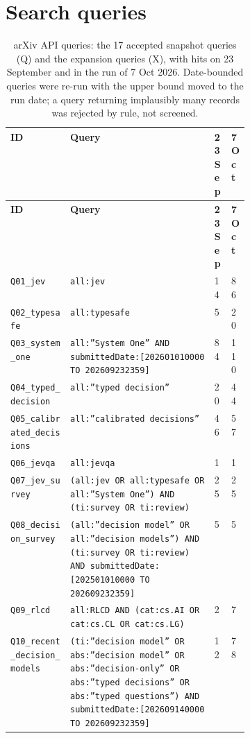 \section{Search queries}\label{sec:appendix-a-search-queries}

{\footnotesize
\begin{xltabular}{\linewidth}{>{\raggedright\arraybackslash}p{0.25\linewidth}Xp{0.075\linewidth}p{0.075\linewidth}}
\caption{arXiv API queries: the 17 accepted snapshot queries (Q) and the expansion queries (X), with hits on 23 September and in the run of 7 Oct 2026. Date-bounded queries were re-run with the upper bound moved to the run date; a query returning implausibly many records was rejected by rule, not screened.}\label{tab:queries}\\
\toprule
\textbf{ID} & \textbf{Query} & \textbf{23 Sep} & \textbf{7 Oct} \\
\midrule
\endfirsthead
\toprule
\textbf{ID} & \textbf{Query} & \textbf{23 Sep} & \textbf{7 Oct} \\
\midrule
\endhead
\texttt{\footnotesize Q01\_jev} & \texttt{\footnotesize all:jev} & 14 & 86 \\
\texttt{\footnotesize Q02\_typesafe} & \texttt{\footnotesize all:typesafe} & 5 & 20 \\
\texttt{\footnotesize Q03\_system\_one} & \texttt{\footnotesize all:”System One” AND submittedDate:[202601010000 TO 202609232359]} & 84 & 110 \\
\texttt{\footnotesize Q04\_typed\_decision} & \texttt{\footnotesize all:”typed decision”} & 20 & 44 \\
\texttt{\footnotesize Q05\_calibrated\_decisions} & \texttt{\footnotesize all:”calibrated decisions”} & 46 & 57 \\
\texttt{\footnotesize Q06\_jevqa} & \texttt{\footnotesize all:jevqa} & 1 & 1 \\
\texttt{\footnotesize Q07\_jev\_survey} & \texttt{\footnotesize (all:jev OR all:typesafe OR all:”System One”) AND (ti:survey OR ti:review)} & 25 & 25 \\
\texttt{\footnotesize Q08\_decision\_survey} & \texttt{\footnotesize (all:”decision model” OR all:”decision models”) AND (ti:survey OR ti:review) AND submittedDate:[202501010000 TO 202609232359]} & 5 & 5 \\
\texttt{\footnotesize Q09\_rlcd} & \texttt{\footnotesize all:RLCD AND (cat:cs.AI OR cat:cs.CL OR cat:cs.LG)} & 2 & 7 \\
\texttt{\footnotesize Q10\_recent\_decision\_models} & \texttt{\footnotesize (ti:”decision model” OR abs:”decision model” OR abs:”decision-only” OR abs:”typed decisions” OR abs:”typed questions”) AND submittedDate:[202609140000 TO 202609232359]} & 12 & 78 \\

\end{xltabular}}
